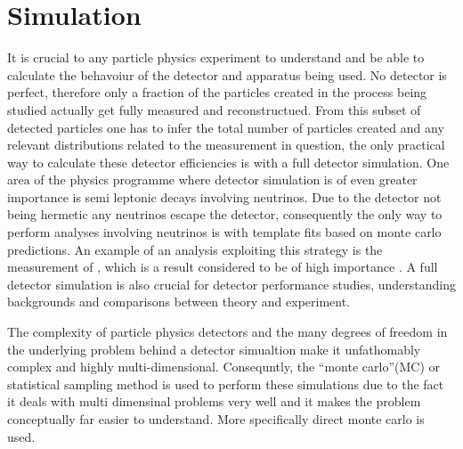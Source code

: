 
\section{Simulation}
\label{sec:Simulation}
It is crucial to any particle physics experiment to understand and be able to calculate the behavoiur of the detector and apparatus being used.  No detector is perfect, therefore only a fraction of the particles created in the process being studied actually get fully measured and reconstructued.  From this subset of detected particles one has to infer the total number of particles created and any relevant distributions related to the measurement in question, the only practical way to calculate these detector efficiencies is with a full detector simulation.  One area of the \lhcb physics programme where detector simulation is of even greater importance is semi leptonic decays involving neutrinos.  Due to the \lhcb detector not being hermetic any neutrinos escape the detector, consequently the only way to perform analyses involving neutrinos is with template fits based on monte carlo predictions.  An example of an analysis exploiting this strategy is the measurement of \Vub, which is a result considered to be of high importance \cite{LHCb-PAPER-2015-013}.  A full detector simulation is also crucial for detector performance studies, understanding backgrounds and comparisons between theory and experiment.

The complexity of particle physics detectors and the many degrees of freedom in the underlying problem behind a detector simualtion make it unfathomably complex and highly multi-dimensional.  Consequntly, the ``monte carlo''(MC) or statistical sampling method is used to perform these simulations due to the fact it deals with multi dimensinal problems very well and it makes the problem conceptually far easier to understand.  More specifically direct monte carlo is used.

